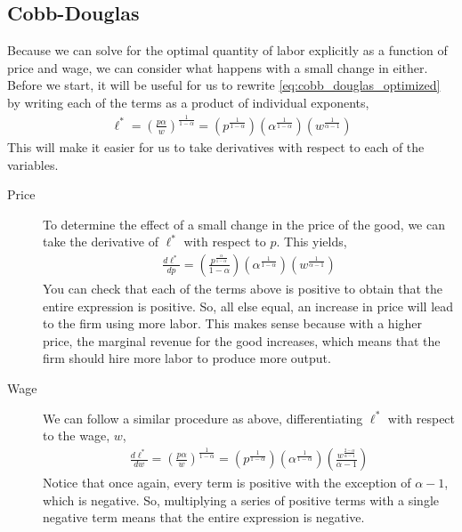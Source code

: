 \subsection{Cobb-Douglas}
Because we can solve for the optimal quantity of labor explicitly as a function of price and wage, we can consider what happens with a small change in either. Before we start, it will be useful for us to rewrite \ref{eq:cobb_douglas_optimized} by writing each of the terms as a product of individual exponents,
\begin{align}
    \ell^* = \left(\frac{p \alpha}{w}\right)^{\frac{1}{1 - \alpha}} = \left(p^{\frac{1}{1 - \alpha}}\right) \left(\alpha^{\frac{1}{1 - \alpha}}\right) \left(w^{\frac{1}{\alpha - 1}}\right) \label{eq:cobb_douglas_optimized_simple}
\end{align}
This will make it easier for us to take derivatives with respect to each of the variables. 
\begin{description}
    \item[Price] To determine the effect of a small change in the price of the good, we can take the derivative of $\ell^*$ with respect to $p$. This yields,
    \begin{align*}
        \frac{d\ell^*}{dp} = \left(\frac{p^{\frac{\alpha}{1 - \alpha}}}{1 - \alpha}\right)\left(\alpha^{\frac{1}{1 - \alpha}}\right) \left(w^{\frac{1}{\alpha - 1}}\right)
    \end{align*}
    You can check that each of the terms above is positive to obtain that the entire expression is positive. So, all else equal, an increase in price will lead to the firm using more labor. This makes sense because with a higher price, the marginal revenue for the good increases, which means that the firm should hire more labor to produce more output. 
    \item[Wage] We can follow a similar procedure as above, differentiating $\ell^*$ with respect to the wage, $w$,
    \begin{align*}
        \frac{d\ell^*}{dw} = \left(\frac{p \alpha}{w}\right)^{\frac{1}{1 - \alpha}} = \left(p^{\frac{1}{1 - \alpha}}\right) \left(\alpha^{\frac{1}{1 - \alpha}}\right) \left(\frac{w^{\frac{2 - \alpha}{\alpha - 1}}}{\alpha - 1}\right)
    \end{align*}
    Notice that once again, every term is positive with the exception of $\alpha - 1$, which is negative. So, multiplying a series of positive terms with a single negative term means that the entire expression is negative.
\end{description}